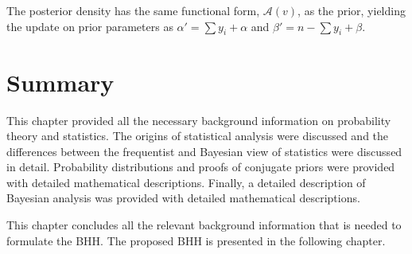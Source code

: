 The posterior density has the same functional form, $\mathcal{A}(v)$, as the prior, yielding the update on prior parameters as $\alpha' = \sum y_{i} + \alpha$ and $\beta' = n - \sum y_{i} + \beta$.


\section{Summary}\label{sec:probability:summary}

This chapter provided all the necessary background information on probability theory and statistics. The origins of statistical analysis were discussed and the differences between the frequentist and Bayesian view of statistics were discussed in detail. Probability distributions and proofs of conjugate priors were provided with detailed mathematical descriptions. Finally, a detailed description of Bayesian analysis was provided with detailed mathematical descriptions.

This chapter concludes all the relevant background information that is needed to formulate the \acs{BHH}. The proposed \acs{BHH} is presented in the following chapter.